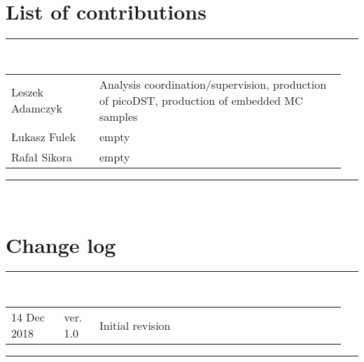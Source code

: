 \section*{List of contributions}%
%
   \rule{\textwidth}{1.5pt}\\[5pt]%
      \begin{tabular}{>{\raggedright}p{0.25\linewidth}p{0.7\linewidth}}
		Leszek Adamczyk & Analysis coordination/supervision, production of picoDST, production of embedded MC samples\\
		Łukasz Fulek & empty\\
        Rafał Sikora &  empty\\
      \end{tabular}\newline
   \rule{\textwidth}{1.5pt}\\[50pt]%
\section*{Change log}%
%
  \rule{\textwidth}{1.5pt}\\[5pt]%
  \begin{tabular}{>{\raggedright}p{0.15\linewidth}p{0.1\linewidth}p{0.7\linewidth}}
  	14 Dec 2018 & ver. 1.0 & Initial revision
  \end{tabular}\newline%
 \rule{\textwidth}{1.5pt}